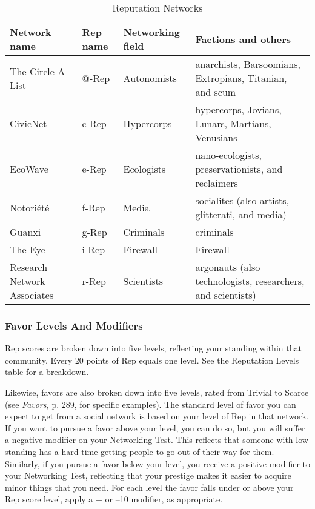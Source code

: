 \begin{table} \caption{Reputation Networks} \begin{tabularx}{\textwidth}{|X|l|l|X|} \hline



Network name &Rep name &Networking field &Factions and others \\ \hline

The Circle-A List &@-Rep &Autonomists &anarchists, Barsoomians, Extropians, Titanian, and scum \\ \hline

CivicNet &c-Rep &Hypercorps &hypercorps, Jovians, Lunars, Martians, Venusians \\ \hline

EcoWave &e-Rep &Ecologists &nano-ecologists, preservationists, and reclaimers \\ \hline

Notoriété &f-Rep &Media &socialites (also artists, glitterati, and media) \\ \hline

Guanxi &g-Rep &Criminals &criminals \\ \hline

The Eye &i-Rep &Firewall &Firewall \\ \hline

Research Network Associates &r-Rep &Scientists &argonauts (also technologists, researchers, and scientists) \\ \hline

\end{tabularx} \end{table} 

\subsubsection{Favor Levels And Modifiers} 

Rep scores are broken down into five levels, reflecting your standing within that community. Every 20 points of Rep equals one level. See the Reputation Levels table for a breakdown. 

Likewise, favors are also broken down into five levels, rated from Trivial to Scarce (see \textit{Favors,} p. 289, for specific examples). The standard level of favor you can expect to get from a social network is based on your level of Rep in that network. If you want to pursue a favor above your level, you can do so, but you will suffer a negative modifier on your Networking Test. This reflects that someone with low standing has a hard time getting people to go out of their way for them. Similarly, if you pursue a favor below your level, you receive a positive modifier to your Networking Test, reflecting that your prestige makes it easier to acquire minor things that you need. For each level the favor falls under or above your Rep score level, apply a + or –10 modifier, as appropriate. 

